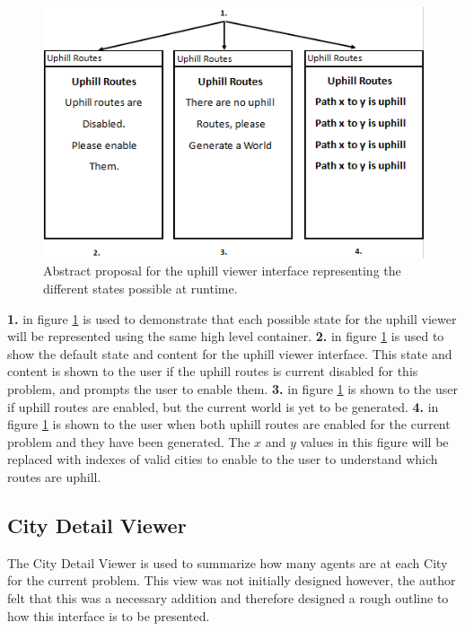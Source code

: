 \begin{figure}[H]
\centering
\includegraphics[scale=0.7]{Images/chapter4/uphilviews}
\caption{Abstract proposal for the uphill viewer interface representing the different states possible at runtime.}
\label{fig:uphillViewImp}
\end{figure}

\textbf{1.} in figure \ref{fig:uphillViewImp} is used to demonstrate that each possible state for the uphill viewer will be represented using the same high level container. \textbf{2.} in figure \ref{fig:uphillViewImp} is used to show the default state and content for the uphill viewer interface. This state and content is shown to the user if the uphill routes is current disabled for this problem, and prompts the user to enable them. \textbf{3.} in figure \ref{fig:uphillViewImp} is shown to the user if uphill routes are enabled, but the current world is yet to be generated. \textbf{4.} in figure \ref{fig:uphillViewImp} is shown to the user when both uphill routes are enabled for the current problem and they have been generated. The $x$ and $y$ values in this figure will be replaced with indexes of valid cities to enable to the user to understand which routes are uphill.

\subsection{City Detail Viewer}
\label{deetzlview}

The City Detail Viewer is used to summarize how many agents are at each City for the current problem. This view was not initially designed however, the author felt that this was a necessary addition and therefore designed a rough outline to how this interface is to be presented.

